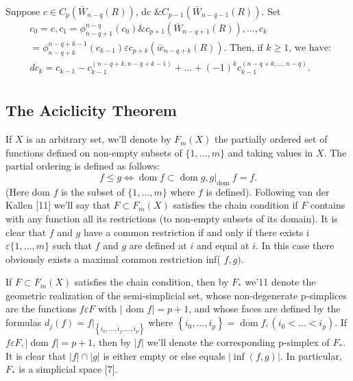 \begin{lemm}
Suppose $c \in C_p\left(\bar{W}_{n-q}(R)\right)$, dc $\& C_{p-1}\left(\bar{W}_{n-q-1}(R)\right)$. Set
    $$
    \begin{aligned}
    & c_0=c, c_1=\phi_{n-q+1}^{n-q}\left(c_0\right) \& c_{p+1}\left(\bar{W}_{n-q+1}(R)\right), \ldots, c_k \\
    & =\phi_{n-q+k}^{n-q+k-1}\left(c_{k-1}\right) \varepsilon c_{p+k}\left(\bar{w}_{n-q+k}(R)\right) \text {. Then, if } k \geq 1 \text {, we have: } \\
    & d c_k=c_{k-1}-c_{k-1}^{(n-q+k, n-q+k-1)}+\ldots+(-1)^k c_{k-1}^{(n-q+k, \ldots, n-q)} . \\
    &
    \end{aligned}$$
\end{lemm}


\subsection{The Aciclicity Theorem}

If $X$ is an arbitrary set, we'll denote by $F_m(X)$ the partially ordered set of functions defined on non-empty subsets of $\{1, \ldots, m\}$ and taking values in $X$. The partial ordering is defined as follows:
$$
f \leq g \Leftrightarrow \operatorname{dom} f \subset \operatorname{dom} g,\left.g\right|_{\text {dom }} f=f .
$$
(Here dom $f$ is the subset of $\{1, \ldots, m\}$ where $f$ is defined). Following van der Kallen [11] we'll say that $F \subset F_m(X)$ satisfies the chain condition if $F$ contains with any function all its restrictions (to non-empty subsets of its domain). It is clear that $f$ and $g$ have a common restriction if and only if there exists i $\varepsilon\{1, \ldots, m\}$ such that $f$ and $g$ are defined at $i$ and equal at $i$. In this case there obviously exists a maximal common restriction inf( $f, g)$.

If $F \subset F_m(X)$ satisfies the chain condition, then by $F_*$ we'11 denote the geometric realization of the semi-simplicial set, whose non-degenerate p-simplices are the functions $f \varepsilon F$ with $\mid$ dom $f \mid=p+1$, and whose faces are defined by the formulas $d_j(f)=\left.f\right|_{\left\{i_0, \ldots, \hat{i}_j, \ldots, i_p\right\}}$ where $\left\{i_0, \ldots, i_p\right\}=\operatorname{dom} f,\left(i_0<\ldots<i_p\right)$. If $f \varepsilon F,|\operatorname{dom} f|=p+1$, then by $|f|$ we'll denote the corresponding p-simplex of $F_*$. It is clear that $|f| \cap|g|$ is either empty or else equals $|\inf (f, g)|$. In particular, $F_*$ is a simplicial space [7].

